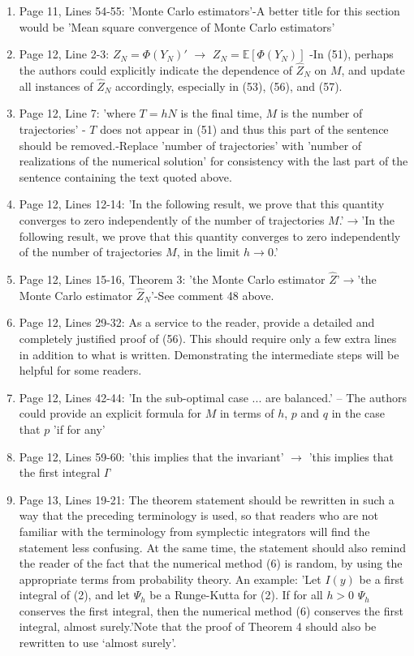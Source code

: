 \documentclass{article}
\begin{document}
\begin{enumerate}[label=(\arabic*)]
		\item Page 11, Lines 54-55: 'Monte Carlo estimators'-A better title for this section would be 'Mean square convergence of Monte Carlo estimators'
		\item Page 12, Line 2-3: $Z_N=\Phi(Y_N)'$ $\to$ $Z_N =\mathbb{E}[\Phi(Y_N)]$ -In (51), perhaps the authors could explicitly indicate the dependence of $\widehat{Z}_N$ on $M$, and update all instances of $\widehat{Z}_N$ accordingly, especially in (53), (56), and (57).
		\item Page 12, Line 7: 'where $T=hN$ is the final time, $M$ is the number of trajectories' - $T$ does not appear in (51) and thus this part of the sentence should be removed.-Replace 'number of trajectories' with 'number of realizations of the numerical solution' for consistency with the last part of the sentence containing the text quoted above.
		\item Page 12, Lines 12-14: 'In the following result, we prove that this quantity converges to zero independently of the number of trajectories $M$.'$\to$'In the following result, we prove that this quantity converges to zero independently of the number of trajectories $M$, in the limit $h\to 0$.'
		\item Page 12, Lines 15-16, Theorem 3: 'the Monte Carlo estimator $\widehat{Z}$'$\to$'the Monte Carlo estimator $\widehat{Z}_N$'-See comment 48 above.
		\item Page 12, Lines 29-32: As a service to the reader, provide a detailed and completely justified proof of (56). This should require only a few extra lines in addition to what is written. Demonstrating the intermediate steps will be helpful for some readers.
		\item Page 12, Lines 42-44: 'In the sub-optimal case ... are balanced.' -- The authors could provide an explicit formula for $M$ in terms of $h$, $p$ and $q$ in the case that $p$ 'if for any'
		\item Page 12, Lines 59-60: 'this implies that the invariant' $\to$ 'this implies that the first integral $I$'
		\item Page 13, Lines 19-21: The theorem statement should be rewritten in such a way that the preceding terminology is used, so that readers who are not familiar with the terminology from symplectic integrators will find the statement less confusing. At the same time, the statement should also remind the reader of the fact that the numerical method (6) is random, by using the appropriate terms from probability theory. An example: 'Let $I(y)$ be a first integral of (2), and let $\Psi_h$ be a Runge-Kutta for (2). If for all $h>0$ $\Psi_h$ conserves the first integral, then the numerical method (6) conserves the first integral, almost surely.'Note that the proof of Theorem 4 should also be rewritten to use `almost surely'.

\end{enumerate}
\end{document}
